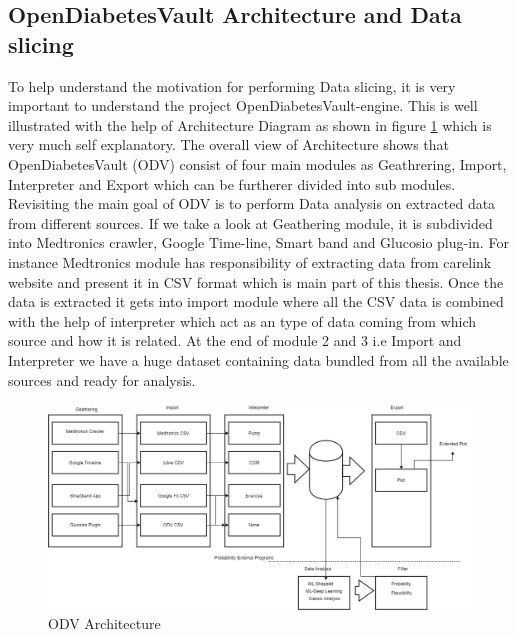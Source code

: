 \documentclass[article,type=msc,colorback,accentcolor=tud9c,twoside,11pt]{tudthesis}
\begin{document}
\subsection{OpenDiabetesVault Architecture and Data slicing}
\label{subsec:OpenDiabetesVaultArchitecture}
To help understand the motivation for performing Data slicing, it is very important to understand the project OpenDiabetesVault-engine. This is well illustrated with the help of Architecture Diagram as shown in figure \ref{fig:ODVArchitecture} which is very much self explanatory. The overall view of Architecture shows that OpenDiabetesVault (ODV) consist of four main modules as Geathrering, Import, Interpreter and Export which can be furtherer divided into sub modules. Revisiting the main goal of ODV is to perform Data analysis on extracted data from different sources. If we take a look at Geathering module, it is subdivided into Medtronics crawler, Google Time-line, Smart band and Glucosio plug-in. For instance Medtronics module has responsibility of extracting data from carelink website and present it in CSV format which is main part of this thesis. Once the data is extracted it gets into import module where all the CSV data is combined with the help of interpreter which act as an type of data coming from which source and how it is related. At the end of module 2 and 3 i.e Import and Interpreter we have a huge dataset containing data bundled from all the available sources and ready for analysis.
\begin{figure}[h]
	\centering
	\includegraphics[scale=0.4]{ODVArchitecture.jpg}
	\caption{ODV Architecture}
	\label{fig:ODVArchitecture}
\end{figure}
\end{document}

